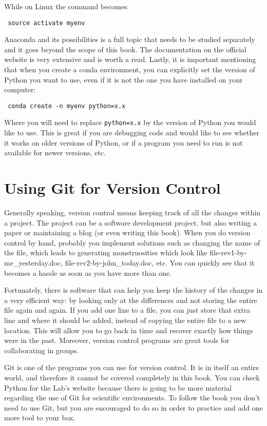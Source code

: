 While on Linux the command becomes:
\begin{verbatim}
 source activate myenv
\end{verbatim}

Anaconda and its possibilities is a full topic that needs to be studied separately and it goes beyond the scope of this book. The documentation on the official website is very extensive and is worth a read. Lastly, it is important mentioning that when you create a conda environment, you can explicitly set the version of Python you want to use, even if it is not the one you have installed on your computer:

\begin{verbatim}
 conda create -n myenv python=x.x
\end{verbatim}

Where you will need to replace \texttt{python=x.x} by the version of Python you would like to use. This is great if you are debugging code and would like to see whether it works on older versions of Python, or if a program you need to run is not available for newer versions, etc.

\section{Using Git for Version Control}
Generally speaking, version control means keeping track of all the changes within a project. The project can be a software development project, but also writing a paper or maintaining a blog (or even writing this book). When you do version control by hand, probably you implement solutions such as changing the name of the file, which leads to generating monstruosities which look like file-rev1-by-me\_yesterday.doc, file-rev2-by-john\_today.doc, etc. You can quickly see that it becomes a hassle as soon as you have more than one.

Fortunately, there is software that can help you keep the history of the changes in a very efficient way: by looking only at the differences and not storing the entire file again and again. If you add one line to a file, you can just store that extra line and where it should be added, instead of copying the entire file to a new location. This will allow you to go back in time and recover exactly how things were in the past. Moreover, version control programs are great tools for collaborating in groups.

Git is one of the programs you can use for version control. It is in itself an entire world, and therefore it cannot be covered completely in this book. You can check Python for the Lab’s website because there is going to be more material regarding the use of Git for scientific environments. To follow the book you don’t need to use Git, but you are encouraged to do so in order to practice and add one more tool to your box.

